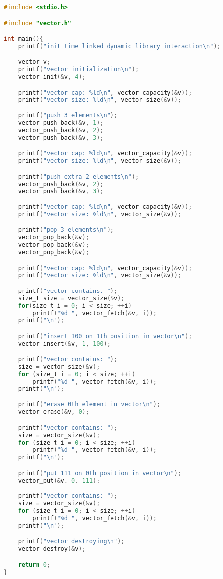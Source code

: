 \documentclass[12pt]{article}
\begin{document}
\begin{lstlisting}[language=C, basicstyle=\scriptsize]
#include <stdio.h>

#include "vector.h"

int main(){
    printf("init time linked dynamic library interaction\n");

    vector v;
    printf("vector initialization\n");
    vector_init(&v, 4);

    printf("vector cap: %ld\n", vector_capacity(&v));
    printf("vector size: %ld\n", vector_size(&v));

    printf("push 3 elements\n");
    vector_push_back(&v, 1);
    vector_push_back(&v, 2);
    vector_push_back(&v, 3);

    printf("vector cap: %ld\n", vector_capacity(&v));
    printf("vector size: %ld\n", vector_size(&v));

    printf("push extra 2 elements\n");
    vector_push_back(&v, 2);
    vector_push_back(&v, 3);

    printf("vector cap: %ld\n", vector_capacity(&v));
    printf("vector size: %ld\n", vector_size(&v));

    printf("pop 3 elements\n");
    vector_pop_back(&v);
    vector_pop_back(&v);
    vector_pop_back(&v);

    printf("vector cap: %ld\n", vector_capacity(&v));
    printf("vector size: %ld\n", vector_size(&v));

    printf("vector contains: ");
    size_t size = vector_size(&v);
    for(size_t i = 0; i < size; ++i)
        printf("%d ", vector_fetch(&v, i));
    printf("\n");

    printf("insert 100 on 1th position in vector\n");
    vector_insert(&v, 1, 100);

    printf("vector contains: ");
    size = vector_size(&v);
    for (size_t i = 0; i < size; ++i)
        printf("%d ", vector_fetch(&v, i));
    printf("\n");

    printf("erase 0th element in vector\n");
    vector_erase(&v, 0);

    printf("vector contains: ");
    size = vector_size(&v);
    for (size_t i = 0; i < size; ++i)
        printf("%d ", vector_fetch(&v, i));
    printf("\n");

    printf("put 111 on 0th position in vector\n");
    vector_put(&v, 0, 111);

    printf("vector contains: ");
    size = vector_size(&v);
    for (size_t i = 0; i < size; ++i)
        printf("%d ", vector_fetch(&v, i));
    printf("\n");

    printf("vector destroying\n");
    vector_destroy(&v);

    return 0;
}
\end{lstlisting}
\end{document}
